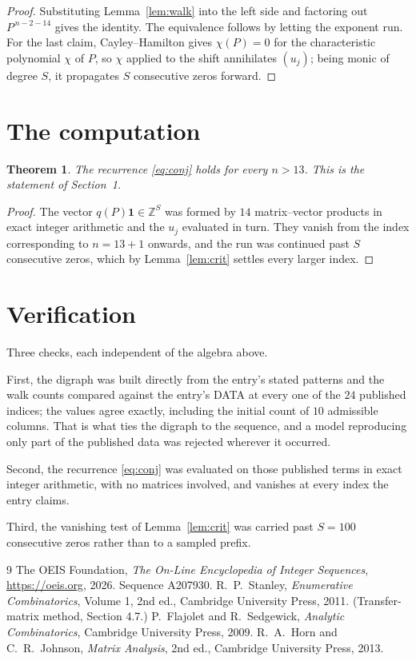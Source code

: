 \documentclass[11pt,a4paper]{article}
\theoremstyle{plain}
\newtheorem{theorem}{Theorem}
\theoremstyle{definition}
\begin{document}
\begin{proof}
Substituting Lemma~\ref{lem:walk} into the left side and factoring out
$P^{\,n-2-14}$ gives the identity. The equivalence follows by letting the exponent
run. For the last claim, Cayley--Hamilton gives $\chi(P)=0$ for the characteristic
polynomial $\chi$ of $P$, so $\chi$ applied to the shift annihilates $(u_j)$; being monic of
degree $S$, it propagates $S$ consecutive zeros forward.
\end{proof}

\section{The computation}

\begin{theorem}
The recurrence \eqref{eq:conj} holds for every $n>13$. This is the statement of
Section~1.
\end{theorem}

\begin{proof}
The vector $q(P)\mathbf{1}\in\mathbb{Z}^{S}$ was formed by $14$ matrix--vector
products in exact integer arithmetic and the $u_j$ evaluated in turn. They vanish from the
index corresponding to $n=13+1$ onwards, and the run was continued past $S$ consecutive
zeros, which by Lemma~\ref{lem:crit} settles every larger index.
\end{proof}

\section{Verification}

Three checks, each independent of the algebra above.

First, the digraph was built directly from the entry's stated patterns and the walk counts
compared against the entry's DATA at every one of the $24$ published indices; the
values agree exactly, including the initial count of $10$ admissible columns. That is
what ties the digraph to the sequence, and a model reproducing only part of the published
data was rejected wherever it occurred.

Second, the recurrence \eqref{eq:conj} was evaluated on those published terms in exact
integer arithmetic, with no matrices involved, and vanishes at every index the entry claims.

Third, the vanishing test of Lemma~\ref{lem:crit} was carried past $S=100$ consecutive
zeros rather than to a sampled prefix.

\begin{thebibliography}{9}
 The OEIS Foundation, \emph{The On-Line Encyclopedia of Integer
Sequences}, \url{https://oeis.org}, 2026. Sequence A207930.
 R.~P.~Stanley, \emph{Enumerative Combinatorics}, Volume 1, 2nd ed.,
Cambridge University Press, 2011. (Transfer-matrix method, Section 4.7.)
 P.~Flajolet and R.~Sedgewick, \emph{Analytic Combinatorics}, Cambridge
University Press, 2009.
 R.~A.~Horn and C.~R.~Johnson, \emph{Matrix Analysis}, 2nd ed., Cambridge
University Press, 2013.
\end{thebibliography}
\end{document}
